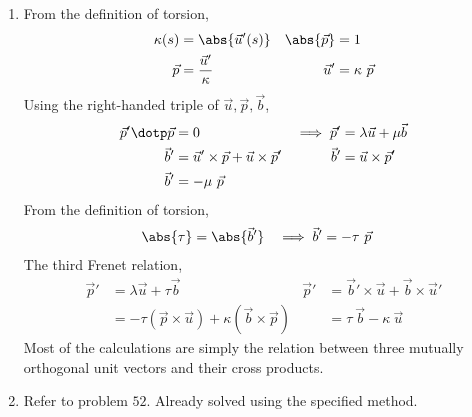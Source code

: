 \begin{enumerate}
    \item From the definition of torsion,
          \begin{align}
              \kappa(s)     & = \abs{\vec{u}'(s)}       &
              \abs{\vec{p}} & = 1                         \\
              \vec{p}       & = \frac{\vec{u}'}{\kappa} &
              \vec{u}'      & = \kappa\ \vec{p}
          \end{align}
          Using the right-handed triple of $ \vec{u}, \vec{p}, \vec{b} $,
          \begin{align}
              \vec{p}' \dotp \vec{p}    & = 0                             &
              \implies \vec{p}'         & = \lambda \vec{u} + \mu \vec{b}   \\
              \vec{b}'                  & = \vec{u}' \times \vec{p}
              + \vec{u} \times \vec{p}' &
              \vec{b}'                  & = \vec{u} \times \vec{p}'         \\
              \vec{b}'                  & = -\mu\ \vec{p}
          \end{align}
          From the definition of torsion,
          \begin{align}
              \abs{\tau}        & = \abs{\vec{b}'} &
              \implies \vec{b}' & = -\tau\ \vec{p}
          \end{align}
          The third Frenet relation,
          \begin{align}
              \vec{p}'                          & = \lambda \vec{u} + \tau \vec{b}                    &
              \vec{p}'                          & = \vec{b}' \times \vec{u} + \vec{b} \times \vec{u}'   \\
                                                & = -\tau (\vec{p} \times \vec{u})
              + \kappa (\vec{b} \times \vec{p}) &
                                                & = \tau \ \vec{b} - \kappa \ \vec{u}
          \end{align}
          Most of the calculations are simply the relation between three mutually
          orthogonal unit vectors and their cross products.

    \item Refer to problem $52$. Already solved using the specified method.
\end{enumerate}